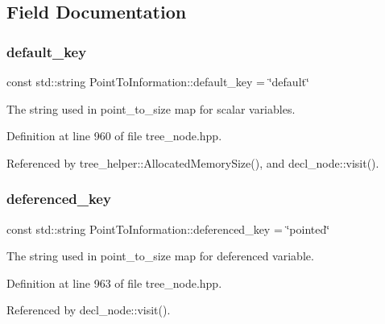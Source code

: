 \subsection{Field Documentation}
\mbox{\label{structPointToInformation_a0c45be243f0e7347471cd3accf0bf3b6}} 
\subsubsection{\texorpdfstring{default\+\_\+key}{default\_key}}
{\footnotesize\ttfamily const std\+::string Point\+To\+Information\+::default\+\_\+key = \char`\"{}default\char`\"{}\hspace{0.3cm}{\ttfamily [static]}}



The string used in point\+\_\+to\+\_\+size map for scalar variables. 



Definition at line 960 of file tree\+\_\+node.\+hpp.



Referenced by tree\+\_\+helper\+::\+Allocated\+Memory\+Size(), and decl\+\_\+node\+::visit().

\mbox{\label{structPointToInformation_a5156ed5d1b7e69205073b3810541d733}} 
\subsubsection{\texorpdfstring{deferenced\+\_\+key}{deferenced\_key}}
{\footnotesize\ttfamily const std\+::string Point\+To\+Information\+::deferenced\+\_\+key = \char`\"{}pointed\char`\"{}\hspace{0.3cm}{\ttfamily [static]}}



The string used in point\+\_\+to\+\_\+size map for deferenced variable. 



Definition at line 963 of file tree\+\_\+node.\+hpp.



Referenced by decl\+\_\+node\+::visit().

